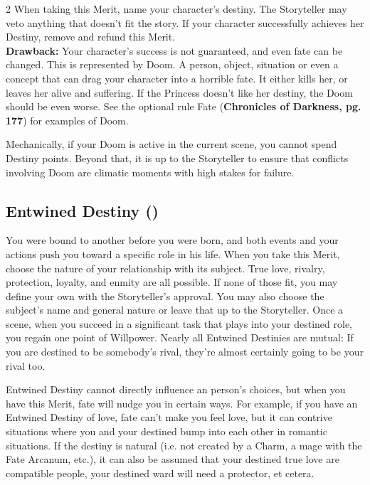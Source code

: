 \begin{multicols}{2}
When taking this Merit, name your character's destiny. The Storyteller may veto anything that doesn't fit the story. If your character successfully achieves her Destiny, remove and refund this Merit.\\

\noindent \textbf{Drawback:} Your character's success is not guaranteed, and even fate can be changed. This is represented by Doom. A person, object, situation or even a concept that can drag your character into a horrible fate. It either kills her, or leaves her alive and suffering. If the Princess doesn't like her destiny, the Doom should be even worse. See the optional rule Fate (\textbf{Chronicles of Darkness, pg. 177}) for examples of Doom. 

Mechanically, if your Doom is active in the current scene, you cannot spend Destiny points. Beyond that, it is up to the Storyteller to ensure that conflicts involving Doom are climatic moments with high stakes for failure.

\subsection*{Entwined Destiny (\textbullet\textbullet\textbullet)}

You were bound to another before you were born, and both events and your actions push you toward a specific role in his life. When you take this Merit, choose the nature of your relationship with its subject. True love, rivalry, protection, loyalty, and enmity are all possible. If none of those fit, you may define your own with the Storyteller's approval. You may also choose the subject's name and general nature or leave that up to the Storyteller. Once a scene, when you succeed in a significant task that plays into your destined role, you regain one point of Willpower. Nearly all Entwined Destinies are mutual: If you are destined to be somebody's rival, they're almost certainly going to be your rival too.  

Entwined Destiny cannot directly influence an person's choices, but when you have this Merit, fate will nudge you in certain ways. For example, if you have an Entwined Destiny of love, fate can't make you feel love, but it can contrive situations where you and your destined bump into each other in romantic situations. If the destiny is natural (i.e. not created by a Charm, a mage with the Fate Arcanum, etc.), it can also be assumed that your destined true love are compatible people, your destined ward will need a protector, et cetera. 


\end{multicols}
